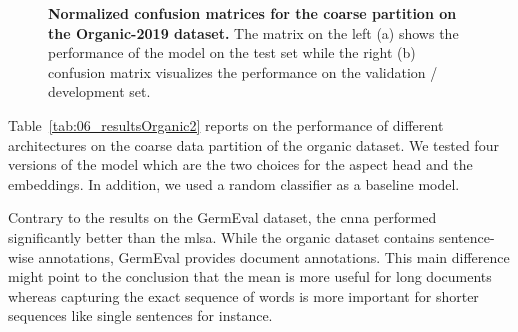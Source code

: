 \begin{figure}[htb]
    \centering
    
    \caption{\textbf{Normalized confusion matrices for the coarse partition on the Organic-2019 dataset.} The matrix on the left {(a)} shows the performance of the model on the test set while the right {(b)} confusion matrix visualizes the performance on the validation / development set.}
    \label{fig:06_ORG_coarse_cmatrices}
\end{figure}

\bigskip
Table~\ref{tab:06_resultsOrganic2} reports on the performance of different architectures on the coarse data partition of the organic dataset. We tested four versions of the model which are the two choices for the aspect head and the embeddings. In addition, we used a random classifier as a baseline model.
\medskip

Contrary to the results on the GermEval dataset, the \acrfull{cnna} performed significantly better than the \acrfull{mlsa}. While the organic dataset contains sentence-wise annotations, GermEval provides document annotations. This main difference might point to the conclusion that the mean is more useful for long documents whereas capturing the exact sequence of words is more important for shorter sequences like single sentences for instance. 
\bigskip

